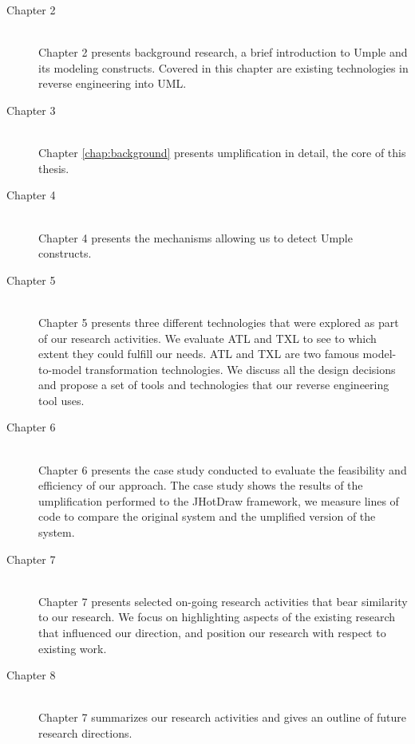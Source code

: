 \begin{description}
  \item[Chapter 2] \hfill \\
Chapter 2 presents background research, a brief introduction to Umple and its modeling constructs. Covered in this chapter are existing technologies in reverse engineering into UML. 
  \item[Chapter 3] \hfill \\
Chapter \ref{chap:background} presents umplification in detail, the core of this thesis. 
  \item[Chapter 4] \hfill \\
Chapter 4 presents the mechanisms allowing us to detect Umple constructs.
  \item[Chapter 5] \hfill \\
Chapter 5 presents three different technologies that were explored as part of our research activities. We evaluate ATL and TXL to see to which extent they could fulfill our needs. ATL and TXL are two famous model-to-model transformation technologies. We discuss all the design decisions and propose a set of tools and technologies that our reverse engineering tool uses.
    \item[Chapter 6] \hfill \\
Chapter 6 presents the  case study conducted to evaluate the feasibility and efficiency of our approach. The case study shows the results of the umplification performed to the JHotDraw framework, we measure lines of code to compare the original system and the umplified version of the system. 
    \item[Chapter 7] \hfill \\
Chapter 7 presents  selected on-going research activities that bear similarity to our research. We focus on highlighting aspects of the existing research that influenced our direction, and position our research with respect to existing work.
    \item[Chapter 8] \hfill \\
Chapter 7 summarizes our research activities and gives an outline of future research directions.
\end{description}



